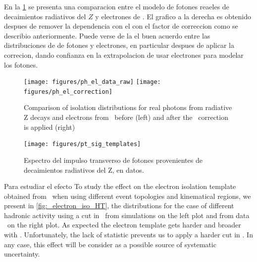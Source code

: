 En la \cref{fig:photon_electron_iso} se presenta una comparacion entre
el modelo de fotones reaeles de decaimientos radiativos del $Z$ y electrones
de {\Zee}. El grafico a la derecha es obtenido despues de remover la dependencia
con el {\pt} con el factor de correccion como se describio anteriormente.
Puede verse de la {\fig} el buen acuerdo entre las distribuciones de {\etiso}
de fotones y electrones, en particular despues de aplicar la correcion, dando
confianza en la extrapolacion de usar electrones para modelar los fotones.

\begin{figure}[h]
  \begin{center}
    \texttt{[image: figures/ph\_el\_data\_raw]}
    \texttt{[image: figures/ph\_el\_correction]}
    \caption{Comparison of isolation distributions  for real photons from radiative
      Z decays and electrons from \Zee\ before (left) and after the \pt\ correction
      is applied (right)}
    \label{fig:photon_electron_iso}
  \end{center}
\end{figure}

\begin{figure}[h]
  \begin{center}
    \texttt{[image: figures/pt\_sig\_templates]}
    \caption{Espectro del impulso transverso de fotones provenientes de decaimientos
      radiativos del Z, en datos.}
    \label{fig:zllg_pt}
  \end{center}
\end{figure}

Para estudiar el efecto To study the effect on the electron isolation template obtained from \Zee\ when using different
event topologies and kinematical regions, we present in \cref{fig:_electron_iso_HT},
the distributions for the case of different hadronic activity using a cut in \HT\ from simulations
on the left plot and from data \Zee\ on the right plot. As expected the electron template gets harder
and broader with \HT.  Unfortunately, the lack of statistic prevents us to apply a harder cut in \HT.
In any case, this effect will be consider as a possible source of systematic uncertainty.

